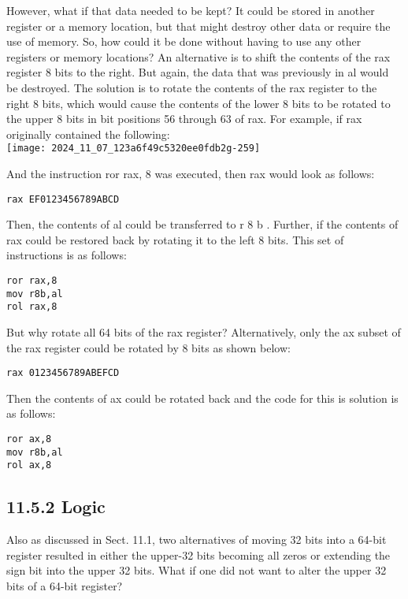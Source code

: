 \documentclass[10pt]{article}
\begin{document}
However, what if that data needed to be kept? It could be stored in another register or a memory location, but that might destroy other data or require the use of memory. So, how could it be done without having to use any other registers or memory locations? An alternative is to shift the contents of the rax register 8 bits to the right. But again, the data that was previously in al would be destroyed. The solution is to rotate the contents of the rax register to the right 8 bits, which would cause the contents of the lower 8 bits to be rotated to the upper 8 bits in bit positions 56 through 63 of rax. For example, if rax originally contained the following:\\
\texttt{[image: 2024\_11\_07\_123a6f49c5320ee0fdb2g-259]}

And the instruction ror rax, 8 was executed, then rax would look as follows:

\begin{verbatim}
rax EF0123456789ABCD
\end{verbatim}

Then, the contents of al could be transferred to r 8 b . Further, if the contents of rax could be restored back by rotating it to the left 8 bits. This set of instructions is as follows:

\begin{verbatim}
ror rax,8
mov r8b,al
rol rax,8
\end{verbatim}

But why rotate all 64 bits of the rax register? Alternatively, only the ax subset of the rax register could be rotated by 8 bits as shown below:

\begin{verbatim}
rax 0123456789ABEFCD
\end{verbatim}

Then the contents of ax could be rotated back and the code for this is solution is as follows:

\begin{verbatim}
ror ax,8
mov r8b,al
rol ax,8
\end{verbatim}

\subsection*{11.5.2 Logic}
Also as discussed in Sect. 11.1, two alternatives of moving 32 bits into a 64-bit register resulted in either the upper-32 bits becoming all zeros or extending the sign bit into the upper 32 bits. What if one did not want to alter the upper 32 bits of a 64-bit register?
\end{document}
